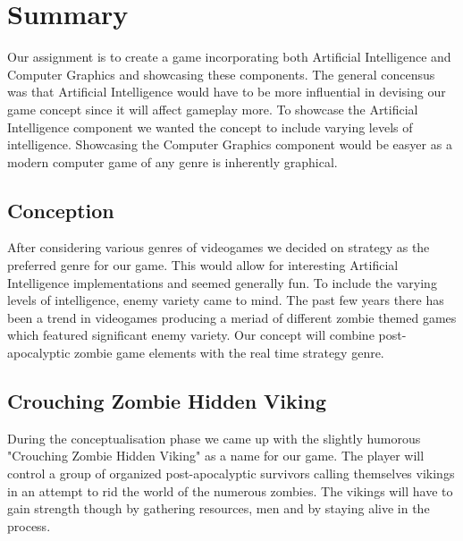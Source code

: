 \chapter{Summary}

Our assignment is to create a game incorporating both Artificial Intelligence and Computer Graphics and showcasing these components. The general concensus was that Artificial Intelligence would have to be more influential in devising our game concept since it will affect gameplay more. To showcase the Artificial Intelligence component we wanted the concept to include varying levels of intelligence. Showcasing the Computer Graphics component would be easyer as a modern computer game of any genre is inherently graphical.

\section{Conception}

After considering various genres of videogames we decided on strategy as the preferred genre for our game. This would allow for interesting Artificial Intelligence implementations and seemed generally fun. To include the varying levels of intelligence, enemy variety came to mind. The past few years there has been a trend in videogames producing a meriad of different zombie themed games which featured significant enemy variety. Our concept will combine  post-apocalyptic zombie game  elements with the real time strategy genre.

\section{Crouching Zombie Hidden Viking}

During the conceptualisation phase we came up with the slightly humorous "Crouching Zombie Hidden Viking" as a name for our game. The player will control a group of organized post-apocalyptic survivors calling themselves vikings in an attempt to rid the world of the numerous zombies. The vikings will have to gain strength though by gathering resources, men and by staying alive in the process.


